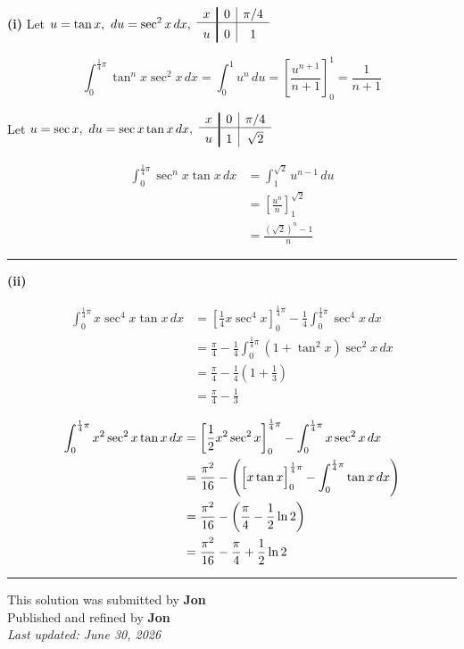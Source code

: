 \documentclass[12pt]{article}
\begin{document}
\newcommand{\ds}{\displaystyle}

\textbf{(i)} Let $\ds u=\tan x,\ du=\sec^2x\,dx, \ 
\renewcommand{\arraystretch}{1}
\begin{array}{c!{\vrule width 1.1pt}c|c}
x & 0 & \pi/4\\
\hline
\rule{0pt}{12pt}
u & 0 & 1
\end{array}
$


$$\int_0^{\frac14\pi}\tan^n x\sec^2x\,dx
=\int_0^1 u^n\,du
=\left[\frac{u^{n+1}}{n+1}\right]_0^1
=\frac1{n+1}$$

Let $\ds u=\sec x,\ du=\sec x\tan x\,dx,\
\renewcommand{\arraystretch}{1}
\begin{array}{c!{\vrule width 1.1pt}c|c}
x & 0 & \pi/4\\
\hline
\rule{0pt}{12pt}
u & 1 & \sqrt2
\end{array}
$

\begin{align*}
\int_0^{\frac14\pi}\sec^n x\tan x\,dx
&=\int_1^{\sqrt2}u^{n-1}\,du\\
&=\left[\frac{u^n}{n}\right]_1^{\sqrt2}\\
&=\frac{(\sqrt2)^n-1}{n}
\end{align*}

\bigskip\hrule\bigskip

\textbf{(ii)}

\begin{align*}
\int_0^{\frac14\pi}x\sec^4x\tan x\,dx
&=\left[\frac14x\sec^4x\right]_0^{\frac14\pi}
-\frac14\int_0^{\frac14\pi}\sec^4x\,dx\\
&=\frac{\pi}{4}-\frac14\int_0^{\frac14\pi}(1+\tan^2x)\sec^2x\,dx\\
&=\frac{\pi}{4}-\frac14\left(1+\frac13\right)\\
&=\frac{\pi}{4}-\frac13
\end{align*}

\begin{align*}
\int_0^{\frac14\pi}x^2\sec^2x\tan x\,dx
&=\left[\frac12x^2\sec^2x\right]_0^{\frac14\pi}
-\int_0^{\frac14\pi}x\sec^2x\,dx\\
&=\frac{\pi^2}{16}
-\left(\Bigl[x\tan x\Bigr]_0^{\frac14\pi}-\int_0^{\frac14\pi}\tan x\,dx\right)\\
&=\frac{\pi^2}{16}-\left(\frac{\pi}{4}-\frac12\ln2\right)\\
&=\frac{\pi^2}{16}-\frac{\pi}{4}+\frac12\ln2
\end{align*}

\bigskip
\hrule
\begin{center}
    This solution was submitted by \textbf{Jon}\\[4pt]
    Published and refined by \textbf{Jon}\\[8pt]
    \textit{Last updated: June 30, 2026}
\end{center}
\end{document}
